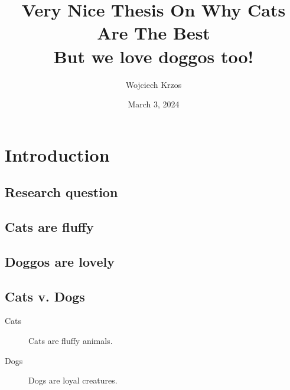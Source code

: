 \documentclass{article}
\begin{document}
    \addtocounter{page}{-1}

    \begin{titlepage}


        \title{
          Very Nice Thesis On Why Cats Are The Best \\
          \large But we love doggos too! }
        
        \author{Wojciech Krzos}
        
        \date{March 3, 2024}
        
        \maketitle

    \end{titlepage}

 
    \tableofcontents
    \clearpage


    \section{Introduction}

        \subsection{Research question}

        \subsection{Cats are fluffy}

        \subsection{Doggos are lovely}

        \subsection{Cats v. Dogs}
            \begin{description}
                \item[Cats] Cats are fluffy animals.
                \item[Dogs] Dogs are loyal creatures.
            \end{description}
\end{document}
